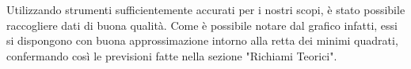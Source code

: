 


Utilizzando strumenti sufficientemente accurati per i nostri scopi, 
è stato possibile raccogliere dati di buona qualità. Come è possibile 
notare dal grafico infatti, essi si dispongono con buona approssimazione 
intorno alla retta dei minimi quadrati, 
confermando così le previsioni fatte nella sezione "Richiami Teorici".